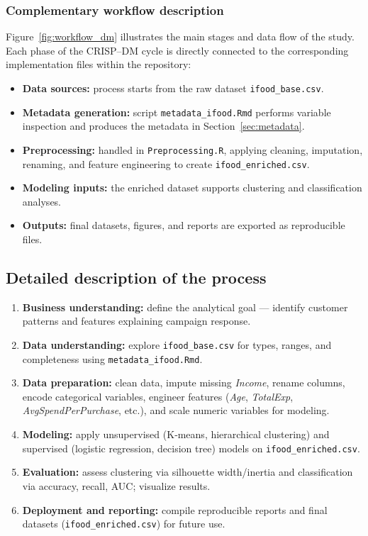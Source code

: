 \subsubsection*{Complementary workflow description}

Figure~\ref{fig:workflow_dm} illustrates the main stages and data flow of the study.  
Each phase of the CRISP--DM cycle is directly connected to the corresponding implementation files within the repository:

\begin{itemize}[leftmargin=1.2cm]
    \item \textbf{Data sources:} process starts from the raw dataset \texttt{ifood\_base.csv}.
    \item \textbf{Metadata generation:} script \texttt{metadata\_ifood.Rmd} performs variable inspection and produces the metadata in Section~\ref{sec:metadata}.
    \item \textbf{Preprocessing:} handled in \texttt{Preprocessing.R}, applying cleaning, imputation, renaming, and feature engineering to create \texttt{ifood\_enriched.csv}.
    \item \textbf{Modeling inputs:} the enriched dataset supports clustering and classification analyses.
    \item \textbf{Outputs:} final datasets, figures, and reports are exported as reproducible files.
\end{itemize}

\subsection{Detailed description of the process}

\begin{enumerate}
    \item \textbf{Business understanding:} define the analytical goal --- identify customer patterns and features explaining campaign response.
    \item \textbf{Data understanding:} explore \texttt{ifood\_base.csv} for types, ranges, and completeness using \texttt{metadata\_ifood.Rmd}.
    \item \textbf{Data preparation:} clean data, impute missing \textit{Income}, rename columns, encode categorical variables, engineer features (\textit{Age}, \textit{TotalExp}, \textit{AvgSpendPerPurchase}, etc.), and scale numeric variables for modeling.
    \item \textbf{Modeling:} apply unsupervised (K‐means, hierarchical clustering) and supervised (logistic regression, decision tree) models on \texttt{ifood\_enriched.csv}.
    \item \textbf{Evaluation:} assess clustering via silhouette width/inertia and classification via accuracy, recall, AUC; visualize results.
    \item \textbf{Deployment and reporting:} compile reproducible reports and final datasets (\texttt{ifood\_enriched.csv}) for future use.
\end{enumerate}

